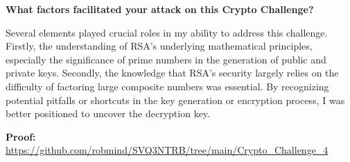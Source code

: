 \documentclass[12pt]{amsart}
\begin{document}
\bigskip

{\bf What factors facilitated your attack on this Crypto Challenge?}
\bigskip

Several elements played crucial roles in my ability to address this challenge. Firstly, the understanding of RSA's underlying mathematical principles, especially the significance of prime numbers in the generation of public and private keys. Secondly, the knowledge that RSA's security largely relies on the difficulty of factoring large composite numbers was essential. By recognizing potential pitfalls or shortcuts in the key generation or encryption process, I was better positioned to uncover the decryption key.

\bigskip

{\bf Proof:} \url{https://github.com/robmind/SVQ3NTRB/tree/main/Crypto_Challenge_4}
\bigskip
\end{document}
